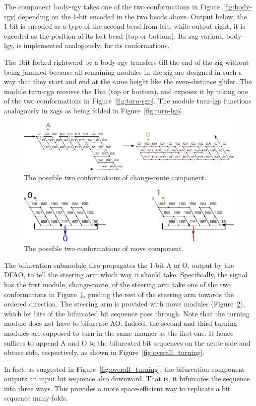 The component body-rgy takes one of the two conformations in Figure~\ref{fig:body-rgy} depending on the 1-bit encoded in the two beads above.
Output below, the 1-bit is encoded as a type of the second bead from left, while output right, it is encoded as the position of its last bead (top or bottom).
Its zag-variant, body-lgy, is implemented analogously; for its conformations.

The 1bit forked rightward by a body-rgy transfers till the end of the zig without being jammed because all remaining modules in the zig are designed in such a way that they start and end at the same height like the even-distance glider.
The module turn-rgp receives the 1bit (top or bottom), and exposes it by taking one of the two comformations in Figure~\ref{fig:turn-rgp}.
The module turn-lgp functions analogously in zags as being folded in Figure~\ref{fig:turn-lgp}.

\begin{figure}[h]
\centering
\includegraphics[width=\linewidth]{pic/change_route.pdf}
\caption{The possible two conformations of change-route component.}
\label{fig:change_route}
\end{figure}

\begin{figure}[h]
\centering
\includegraphics[width=\linewidth]{pic/move.pdf}
\caption{The possible two conformations of move component.}
\label{fig:move}
\end{figure}

The bifurcation submodule also propagates the 1-bit A or O, output by the DFAO, to tell the steering arm which way it should take.
Specifically, the signal has the first module, change-route, of the steering arm take one of the two conformations in Figure~\ref{fig:change_route}, guiding the rest of the steering arm towards the ordered direction.
The steering arm is provided with move modules (Figure~\ref{fig:move}), which let bits of the bifurcated bit sequence pass through.  
Note that the turning module does not have to bifurcate AO.
Indeed, the second and third turning modules are supposed to turn in the same manner as the first one.
It hence suffices to append A and O to the bifurcated bit sequences on the acute side and obtuse side, respectively, as shown in Figure~\ref{fig:overall_turning}.

\begin{remark}
In fact, as suggested in Figure~\ref{fig:overall_turning}, the bifurcation component outputs an input bit sequence also downward.
That is, it bifurcates the sequence into three ways.
This provides a more space-efficient way to replicate a bit sequence many-folds.
\end{remark}

